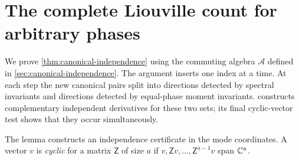\section{The complete Liouville count for arbitrary phases}
\label{sec:integrability-proof}

We prove \cref{thm:canonical-independence} using the commuting algebra
$\mathcal A$ defined in \cref{sec:canonical-independence}.
The argument inserts one index at a time. At each step the new
canonical pairs split into directions detected by spectral invariants
and directions detected by equal-phase moment invariants.
 constructs complementary independent derivatives for these two
sets; its final cyclic-vector test shows that they occur simultaneously.

The lemma constructs an independence certificate in the mode
coordinates. A vector $v$ is \emph{cyclic} for a matrix $\mathsf Z$ of size
$a$ if $v,\mathsf Z v,\ldots,\mathsf Z^{a-1}v$ span $\mathbb C^a$.

